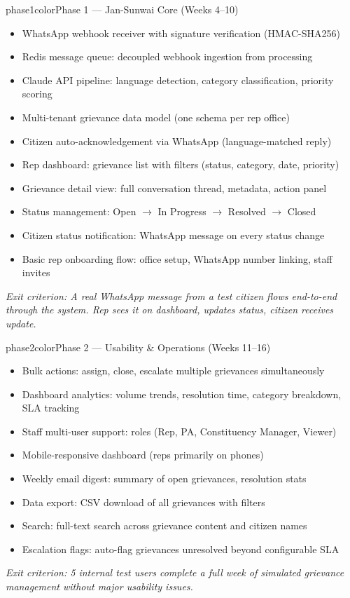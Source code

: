 \documentclass[12pt, a4paper]{article}
\begin{document}
\begin{phasebox}{phase1color}{Phase 1 --- Jan-Sunwai Core \quad (Weeks 4--10)}
\begin{itemize}[leftmargin=1.2em, itemsep=0.15em]
    \item WhatsApp webhook receiver with signature verification (HMAC-SHA256)
    \item Redis message queue: decoupled webhook ingestion from processing
    \item Claude API pipeline: language detection, category classification, priority scoring
    \item Multi-tenant grievance data model (one schema per rep office)
    \item Citizen auto-acknowledgement via WhatsApp (language-matched reply)
    \item Rep dashboard: grievance list with filters (status, category, date, priority)
    \item Grievance detail view: full conversation thread, metadata, action panel
    \item Status management: Open $\to$ In Progress $\to$ Resolved $\to$ Closed
    \item Citizen status notification: WhatsApp message on every status change
    \item Basic rep onboarding flow: office setup, WhatsApp number linking, staff invites
\end{itemize}
\textit{Exit criterion: A real WhatsApp message from a test citizen flows end-to-end through the system. Rep sees it on dashboard, updates status, citizen receives update.}
\end{phasebox}

\vspace{0.5em}

\begin{phasebox}{phase2color}{Phase 2 --- Usability \& Operations \quad (Weeks 11--16)}
\begin{itemize}[leftmargin=1.2em, itemsep=0.15em]
    \item Bulk actions: assign, close, escalate multiple grievances simultaneously
    \item Dashboard analytics: volume trends, resolution time, category breakdown, SLA tracking
    \item Staff multi-user support: roles (Rep, PA, Constituency Manager, Viewer)
    \item Mobile-responsive dashboard (reps primarily on phones)
    \item Weekly email digest: summary of open grievances, resolution stats
    \item Data export: CSV download of all grievances with filters
    \item Search: full-text search across grievance content and citizen names
    \item Escalation flags: auto-flag grievances unresolved beyond configurable SLA
\end{itemize}
\textit{Exit criterion: 5 internal test users complete a full week of simulated grievance management without major usability issues.}
\end{phasebox}
\end{document}
